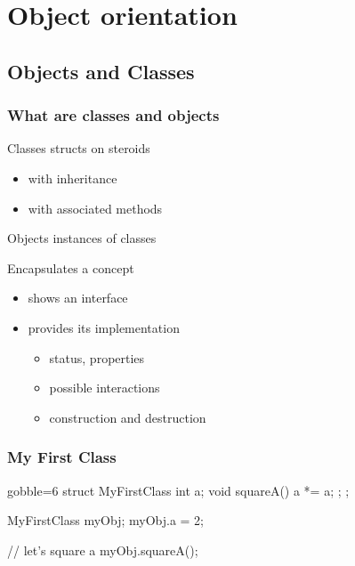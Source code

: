 \section[OO]{Object orientation}

\subsection{Objects and Classes}

\begin{frame}[fragile]
  \frametitle{What are classes and objects}
  \begin{block}{Classes}
    structs on steroids
    \begin{itemize}
    \item with inheritance
    \item with associated methods
    \end{itemize}
  \end{block}
  \begin{block}{Objects}
    instances of classes
  \end{block}
  \begin{block}{Encapsulates a concept}
    \begin{itemize}
    \item shows an interface
    \item provides its implementation
      \begin{itemize}
      \item status, properties
      \item possible interactions
      \item construction and destruction
      \end{itemize}    
    \end{itemize}    
  \end{block}
\end{frame}


\begin{frame}[fragile]
  \frametitle{My First Class}
  \begin{multicols}{2}
    \begin{cppcode*}{gobble=6}
      struct MyFirstClass {
        int a;
        void squareA() {
          a *= a;
        };
      };

      MyFirstClass myObj;
      myObj.a = 2;

      // let's square a
      myObj.squareA();
    \end{cppcode*}
    \columnbreak
    \null \vfill
    \vfill \null
  \end{multicols}
\end{frame}




